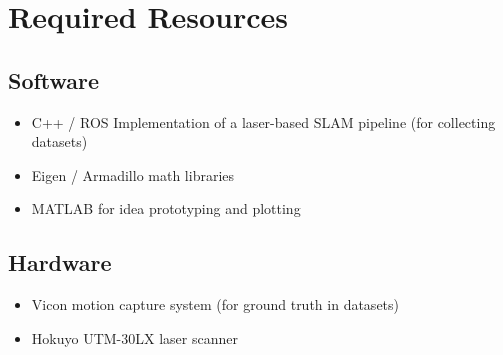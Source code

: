 \section{Required Resources}

\subsection*{Software}
\begin{itemize}[noitemsep,topsep=0pt]
\item C++ / ROS Implementation of a laser-based SLAM pipeline (for collecting datasets)
\item Eigen / Armadillo math libraries
\item MATLAB for idea prototyping and plotting
\end{itemize}

\subsection*{Hardware}
\begin{itemize}[noitemsep,topsep=0pt]
\item Vicon motion capture system (for ground truth in datasets)
\item Hokuyo UTM-30LX laser scanner
\end{itemize}
